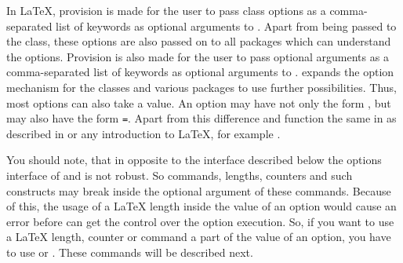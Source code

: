\begin{Declaration}
\end{Declaration}
In \LaTeX{}, provision is made for the user to pass class options as a
comma-separated list of keywords as optional arguments to
.
Apart from being passed to the class,
these options are also passed on to all packages which can understand
the options. Provision is also made for the user to pass optional
arguments as a comma-separated list of keywords as optional arguments
to .  {\KOMAScript}
expands the
option mechanism for the {\KOMAScript} classes and various packages to
use further possibilities. Thus, most {\KOMAScript} options can also
take a value. An option may have not only the form , but
may also have the form \texttt{=}. Apart
from this difference  and 
function the same in {\KOMAScript} as described in
\cite{latex:usrguide} or any introduction to \LaTeX, for example
\cite{lshort}.%


You should note, that in opposite to the interface
described below the options interface of  and
 is not robust. So commands, lengths, counters and such
constructs may break inside the optional argument of these commands. Because
of this, the usage of a \LaTeX{} length inside the value of an option would
cause an error before \KOMAScript{} can get the control over the option
execution. So, if you want to use a \LaTeX{} length, counter or command a part
of the value of an option, you have to use
 or
. These commands will be described next.%
%
\EndIndexGroup


